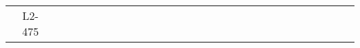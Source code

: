 \documentclass{article}
\begin{document}
\begin{table*}[]
\begin{tabular}{cc|cccccccccccccccccccccccccccc}
        &L2-475& \hspace{-1.2em} & \hspace{-0.9em}
\end{tabular}
\end{table*}
\end{document}
